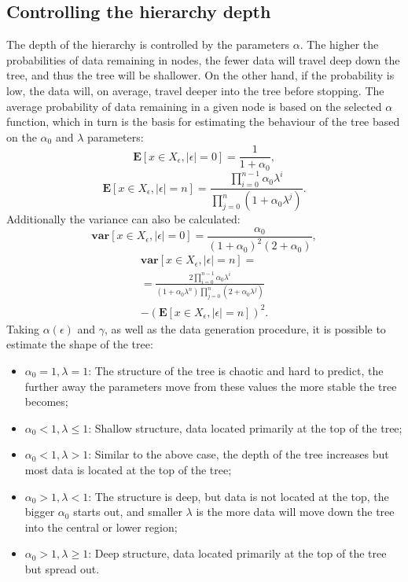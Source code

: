\documentclass{article}
\begin{document}
	\subsection{Controlling the hierarchy depth}
    \label{sec:controlling-the-hierarchy-depth}
	The depth of the hierarchy is controlled by the parameters $\alpha$. The higher the probabilities of data remaining in nodes, the fewer data will travel deep down the tree, and thus the tree will be shallower. On the other hand, if the probability is low, the data will, on average, travel deeper into the tree before stopping. The average probability of data remaining in a given node is based on the selected $\alpha$ function, which in turn is the basis for estimating the behaviour of the tree based on the $\alpha_0$ and $\lambda$ parameters:
	\begin{equation}
	\mathbf{E}[x \in X_\epsilon, |\epsilon| = 0] = \frac{1}{1 + \alpha_0},
	\end{equation}
	\begin{equation}
	\mathbf{E}[x \in X_\epsilon, |\epsilon| = n] = \frac{\prod_{i=0}^{n-1} \alpha_0\lambda^i}{\prod_{j=0}^{n}(1 + \alpha_0\lambda^j)}.
	\end{equation}
	Additionally the variance can also be calculated:
	\begin{equation}
	\mathbf{var}[x \in X_\epsilon, |\epsilon| = 0] = \frac{\alpha_0}{(1 + \alpha_0)^2(2 + \alpha_0)},
	\end{equation}
	\begin{equation}
	\begin{multlined}
	\mathbf{var}[x \in X_\epsilon, |\epsilon| = n] = \\ = \frac{2 \prod_{i = 0}^{n-1}\alpha_0\lambda^i}{(1+\alpha_0\lambda^n)\prod_{j=0}^{n}(2+\alpha_0\lambda^j)} \\ - \left(\textbf{E}[x \in X_\epsilon, |\epsilon| = n]\right)^2.
	\end{multlined}
	\end{equation}
	Taking $\alpha(\epsilon)$ and $\gamma$, as well as the data generation procedure, it is possible to estimate the shape of the tree:
    \begin{itemize}
        \item $\alpha_0 = 1, \lambda = 1$: The structure of the tree is chaotic and hard to predict, the further away the parameters move from these values the more stable the tree becomes;
        \item $\alpha_0 < 1, \lambda \leq 1$: Shallow structure, data located primarily at the top of the tree;
        \item $\alpha_0 < 1, \lambda > 1$: Similar to the above case, the depth of the tree increases but most data is located at the top of the tree;
        \item $\alpha_0 > 1, \lambda < 1$: The structure is deep, but data is not located at the top, the bigger $\alpha_0$ starts out, and smaller $\lambda$ is the more data will move down the tree into the central or lower region;
        \item $\alpha_0 > 1, \lambda \geq 1$: Deep structure, data located primarily at the top of the tree but spread out.
    \end{itemize}
\end{document}
